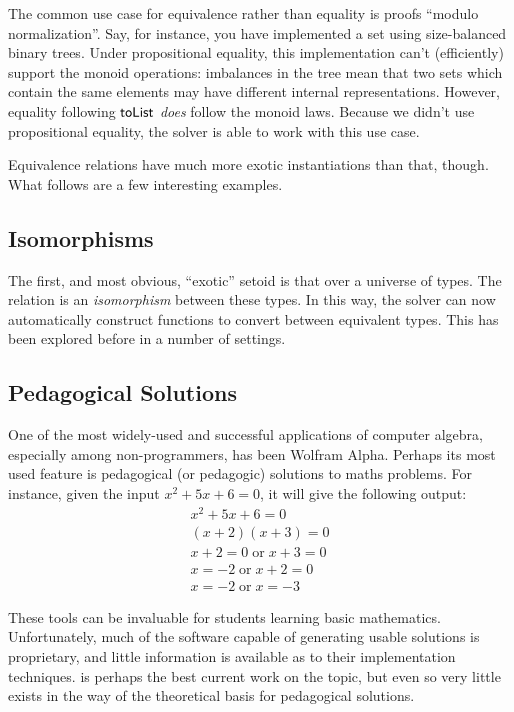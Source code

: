 \documentclass[draft, twocolumn]{article}
\theoremstyle{definition}
\theoremstyle{definition}
\begin{document}
The common use case for equivalence rather than equality is proofs ``modulo
normalization''. Say, for instance, you have implemented a set using
size-balanced binary trees. Under propositional equality, this implementation
can't (efficiently) support the monoid operations: imbalances in the tree mean
that two sets which contain the same elements may have different internal
representations. However, equality following \(\AgdaFunction{toList}\)
\emph{does} follow the monoid laws. Because we didn't use propositional
equality, the solver is able to work with this use case.

Equivalence relations have much more exotic instantiations than that, though.
What follows are a few interesting examples.
\subsection{Isomorphisms}
The first, and most obvious, ``exotic'' setoid is that over a universe of types.
The relation is an \emph{isomorphism} between these types. In this way, the
solver can now automatically construct functions to convert between equivalent
types. This has been explored before in a number of settings.
\subsection{Pedagogical Solutions} 
One of the most widely-used and successful applications of computer algebra,
especially among non-programmers, has been Wolfram
Alpha\cite{wolfram_research_inc._wolframalpha_2019}. Perhaps its most used
feature is pedagogical (or pedagogic) solutions to maths
problems\cite{the_development_team_step-by-step_2009}. For instance, given the
input \(x^2 + 5 x + 6 = 0\), it will give the following output:
\begin{align*}
  x^2 + 5x + 6   = 0 \\
  (x + 2)(x + 3) = 0 \\
  x + 2 = 0   \; \text{or} \; x + 3 = 0 \\
  x     = -2  \; \text{or} \; x + 2 = 0 \\
  x     = -2  \; \text{or} \; x     = -3
\end{align*}

These tools can be invaluable for students learning basic mathematics.
Unfortunately, much of the software capable of generating usable solutions is
proprietary, and little information is available as to their implementation
techniques.\cite{lioubartsev_constructing_2016} is perhaps the best current work
on the topic, but even so very little exists in the way of the theoretical basis
for pedagogical solutions.
\end{document}
